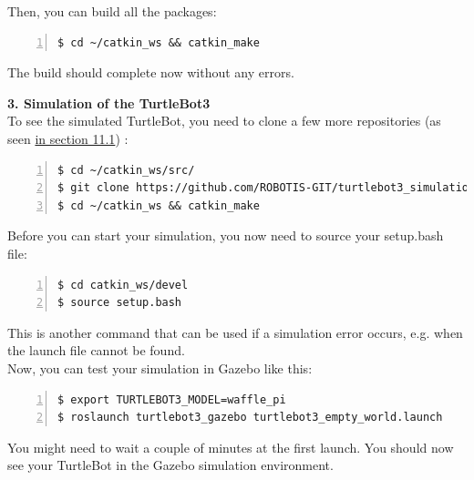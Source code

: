 \documentclass[plainarticle,zihtitle,english,final,hyperref,utf8]{zihpub}
\begin{document}
Then, you can build all the packages:

\begin{Verbatim}[breaklines=true, breakanywhere=true, baselinestretch=1,fontsize=\scriptsize,numbers=left,frame=single,stepnumber=5,xleftmargin=1cm,xrightmargin=1cm]
$ cd ~/catkin_ws && catkin_make
    \end{Verbatim}

The build should complete now without any errors.\\
\newline

\textbf{3. Simulation of the TurtleBot3}\\
\newline
To see the simulated TurtleBot, you need to clone a few more repositories (as seen  \href{https\://emanual.robotis.com/docs/en/platform/turtlebot3/simulation/\#ros-1-simulation}{in section 11.1}) \cite{ros1sim}:

\begin{Verbatim}[breaklines=true, breakanywhere=true, baselinestretch=1,fontsize=\scriptsize,numbers=left,frame=single,stepnumber=5,xleftmargin=1cm,xrightmargin=1cm]
$ cd ~/catkin_ws/src/
$ git clone https://github.com/ROBOTIS-GIT/turtlebot3_simulations.git
$ cd ~/catkin_ws && catkin_make
    \end{Verbatim}

Before you can start your simulation, you now need to source your setup.bash file:
\begin{Verbatim}[breaklines=true, breakanywhere=true, baselinestretch=1,fontsize=\scriptsize,numbers=left,frame=single,stepnumber=5,xleftmargin=1cm,xrightmargin=1cm]
$ cd catkin_ws/devel
$ source setup.bash
    \end{Verbatim}

This is another command that can be used if a simulation error occurs, e.g. when the launch file cannot be found.\\
\newline
Now, you can test your simulation in Gazebo like this:

\begin{Verbatim}[breaklines=true, breakanywhere=true, baselinestretch=1,fontsize=\scriptsize,numbers=left,frame=single,stepnumber=5,xleftmargin=1cm,xrightmargin=1cm]
$ export TURTLEBOT3_MODEL=waffle_pi
$ roslaunch turtlebot3_gazebo turtlebot3_empty_world.launch
    \end{Verbatim}
    
You might need to wait a couple of minutes at the first launch. You should now see your TurtleBot in the Gazebo simulation environment.\\
\newline
\end{document}
